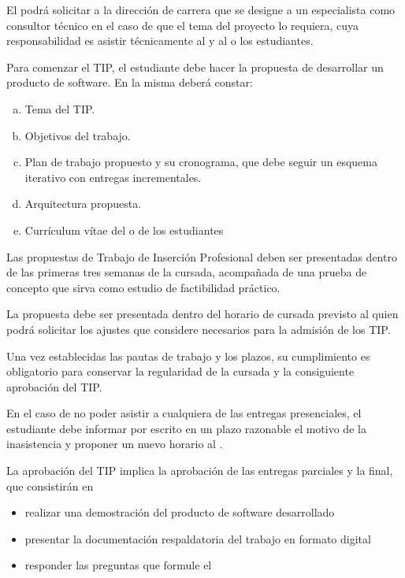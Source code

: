\articulo El \profesorTIP{} podrá solicitar a la dirección de carrera que
se designe a un especialista como consultor técnico en el caso de que el tema
del proyecto lo requiera, cuya responsabilidad es asistir técnicamente al
\profesorTIP{} y al o los estudiantes.



\articulo Para comenzar el TIP, el estudiante debe hacer la propuesta de desarrollar un producto de
software. En la misma deberá constar:

\begin{enumerate}[a.]
\item Tema del TIP.
\item Objetivos del trabajo.
\item Plan de trabajo propuesto y su cronograma, que debe seguir un esquema iterativo con entregas
incrementales.
\item Arquitectura propuesta.
\item Currículum vítae del o de los estudiantes
\end{enumerate}

\articulo Las propuestas de Trabajo de Inserción Profesional deben ser presentadas
dentro de las primeras tres semanas de la cursada, acompañada de una prueba de concepto
que sirva como estudio de factibilidad práctico.

\articulo La propuesta debe ser presentada dentro del horario de cursada previsto al \profesorTIP{}
quien podrá solicitar los ajustes que considere necesarios para la admisión de los TIP. 


\articulo Una vez establecidas las pautas de trabajo y los plazos, 
su cumplimiento es obligatorio para conservar la regularidad de la cursada y la
consiguiente aprobación del TIP.

\articulo En el caso de no poder asistir a cualquiera de las entregas presenciales, el estudiante 
debe informar por escrito en un plazo razonable el motivo de la inasistencia y proponer un nuevo 
horario al \profesorTIP{}.


\articulo La aprobación del TIP implica la aprobación de las entregas parciales
y la final, que consistirán en 
\begin{itemize}
 \item realizar una demostración del producto de software desarrollado
 \item presentar la documentación respaldatoria del trabajo en formato digital
 \item responder las preguntas que formule el \profesorTIP{}
\end{itemize}

